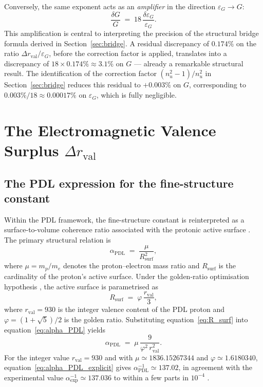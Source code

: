 \documentclass[11pt,a4paper]{article}
\newcommand{\PDL}{\mathrm{PDL}}
\begin{document}
Conversely, the same exponent acts as an \emph{amplifier} in the direction $\varepsilon_G \to G$:
\begin{equation}
    \frac{\delta G}{G} 
    \;=\; 18\,\frac{\delta\varepsilon_G}{\varepsilon_G}.
    \label{eq:uncertainty_up}
\end{equation}
This amplification is central to interpreting the precision of the structural bridge formula derived in Section~\ref{sec:bridge}. A residual discrepancy of $0.174\%$ on the ratio $\Delta r_{\mathrm{val}}/\varepsilon_G$, before the correction factor is applied, translates into a discrepancy of $18 \times 0.174\% \approx 3.1\%$ on $G$ --- already a remarkable structural result. The identification of the correction factor $(n_u^2-1)/n_u^2$ in Section~\ref{sec:bridge} reduces this residual to $+0.003\%$ on $G$, corresponding to $0.003\%/18 \approx 0.00017\%$ on $\varepsilon_G$, which is fully negligible.


\section{The Electromagnetic Valence Surplus 
         \texorpdfstring{$\Delta r_{\mathrm{val}}$}{Delta r\_val}}
\label{sec:delta_r}

\subsection{The PDL expression for the fine-structure constant}

Within the PDL framework, the fine-structure constant is reinterpreted as a surface-to-volume coherence ratio associated with the protonic active surface \cite{Alpha_PDL_2026}. The primary structural relation is
\begin{equation}
    \alpha_{\PDL} \;=\; \frac{\mu}{R_{\mathrm{surf}}^2},
    \label{eq:alpha_PDL}
\end{equation}
where $\mu = m_p/m_e$ denotes the proton--electron mass ratio and $R_{\mathrm{surf}}$ is the cardinality of the proton's active surface. Under the golden-ratio optimisation hypothesis \cite{Golden_Ratio_PDL_2026}, the active surface is parametrised as
\begin{equation}
    R_{\mathrm{surf}} \;=\; \varphi\,\frac{r_{\mathrm{val}}}{3},
    \label{eq:R_surf}
\end{equation}
where $r_{\mathrm{val}} = 930$ is the integer valence content of the PDL proton \cite{Combinatorial_Proton_v2_2026} and $\varphi = (1+\sqrt{5})/2$ is the golden ratio. Substituting equation~\eqref{eq:R_surf} into equation~\eqref{eq:alpha_PDL} yields
\begin{equation}
    \alpha_{\PDL} 
    \;=\; \mu\,\frac{9}{\varphi^2\,r_{\mathrm{val}}^2}.
    \label{eq:alpha_PDL_explicit}
\end{equation}
For the integer value $r_{\mathrm{val}} = 930$ and with $\mu \simeq 1836.15267344$ and $\varphi \simeq 1.6180340$, equation~\eqref{eq:alpha_PDL_explicit} gives $\alpha_{\PDL}^{-1} \simeq 137.02$, in agreement with the experimental value $\alpha_{\exp}^{-1} \simeq 137.036$ to within a few parts in $10^{-4}$ \cite{Alpha_PDL_2026}.
\end{document}
